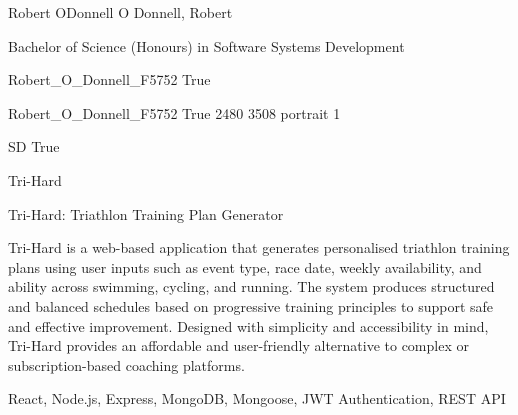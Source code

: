 
\begingroup{}\relax



\def\Key{Robert_O_Donnell_F5752}

{Robert ODonnell}
{O Donnell, Robert}

{Bachelor of Science (Honours) in Software Systems Development}

{Robert_O_Donnell_F5752}
{True}

{Robert_O_Donnell_F5752}
{True}
{2480}
{3508}
{portrait}
{1}

{SD}
{True}

{Tri-Hard}

{Tri-Hard: Triathlon Training Plan Generator}

{Tri-Hard is a web-based application that generates personalised triathlon training plans using user inputs such as event type, race date, weekly availability, and ability across swimming, cycling, and running. The system produces structured and balanced schedules based on progressive training principles to support safe and effective improvement. Designed with simplicity and accessibility in mind, Tri-Hard provides an affordable and user-friendly alternative to complex or subscription-based coaching platforms.}

{React, Node.js, Express, MongoDB, Mongoose, JWT Authentication, REST API}

